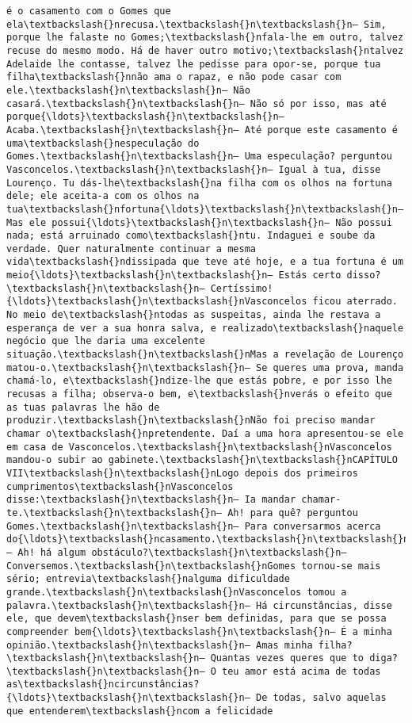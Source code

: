 \documentclass[11pt]{article}
\begin{document}
\begin{Verbatim}[commandchars=\\\{\}]
é o casamento com o Gomes que ela\textbackslash{}nrecusa.\textbackslash{}n\textbackslash{}n— Sim, porque lhe falaste no Gomes;\textbackslash{}nfala-lhe em outro, talvez recuse do mesmo modo. Há de haver outro motivo;\textbackslash{}ntalvez Adelaide lhe contasse, talvez lhe pedisse para opor-se, porque tua filha\textbackslash{}nnão ama o rapaz, e não pode casar com ele.\textbackslash{}n\textbackslash{}n— Não casará.\textbackslash{}n\textbackslash{}n— Não só por isso, mas até porque{\ldots}\textbackslash{}n\textbackslash{}n— Acaba.\textbackslash{}n\textbackslash{}n— Até porque este casamento é uma\textbackslash{}nespeculação do Gomes.\textbackslash{}n\textbackslash{}n— Uma especulação? perguntou Vasconcelos.\textbackslash{}n\textbackslash{}n— Igual à tua, disse Lourenço. Tu dás-lhe\textbackslash{}na filha com os olhos na fortuna dele; ele aceita-a com os olhos na tua\textbackslash{}nfortuna{\ldots}\textbackslash{}n\textbackslash{}n— Mas ele possui{\ldots}\textbackslash{}n\textbackslash{}n— Não possui nada; está arruinado como\textbackslash{}ntu. Indaguei e soube da verdade. Quer naturalmente continuar a mesma vida\textbackslash{}ndissipada que teve até hoje, e a tua fortuna é um meio{\ldots}\textbackslash{}n\textbackslash{}n— Estás certo disso?\textbackslash{}n\textbackslash{}n— Certíssimo!{\ldots}\textbackslash{}n\textbackslash{}nVasconcelos ficou aterrado. No meio de\textbackslash{}ntodas as suspeitas, ainda lhe restava a esperança de ver a sua honra salva, e realizado\textbackslash{}naquele negócio que lhe daria uma excelente situação.\textbackslash{}n\textbackslash{}nMas a revelação de Lourenço matou-o.\textbackslash{}n\textbackslash{}n— Se queres uma prova, manda chamá-lo, e\textbackslash{}ndize-lhe que estás pobre, e por isso lhe recusas a filha; observa-o bem, e\textbackslash{}nverás o efeito que as tuas palavras lhe hão de produzir.\textbackslash{}n\textbackslash{}nNão foi preciso mandar chamar o\textbackslash{}npretendente. Daí a uma hora apresentou-se ele em casa de Vasconcelos.\textbackslash{}n\textbackslash{}nVasconcelos mandou-o subir ao gabinete.\textbackslash{}n\textbackslash{}nCAPÍTULO VII\textbackslash{}n\textbackslash{}nLogo depois dos primeiros cumprimentos\textbackslash{}nVasconcelos disse:\textbackslash{}n\textbackslash{}n— Ia mandar chamar-te.\textbackslash{}n\textbackslash{}n— Ah! para quê? perguntou Gomes.\textbackslash{}n\textbackslash{}n— Para conversarmos acerca do{\ldots}\textbackslash{}ncasamento.\textbackslash{}n\textbackslash{}n— Ah! há algum obstáculo?\textbackslash{}n\textbackslash{}n— Conversemos.\textbackslash{}n\textbackslash{}nGomes tornou-se mais sério; entrevia\textbackslash{}nalguma dificuldade grande.\textbackslash{}n\textbackslash{}nVasconcelos tomou a palavra.\textbackslash{}n\textbackslash{}n— Há circunstâncias, disse ele, que devem\textbackslash{}nser bem definidas, para que se possa compreender bem{\ldots}\textbackslash{}n\textbackslash{}n— É a minha opinião.\textbackslash{}n\textbackslash{}n— Amas minha filha?\textbackslash{}n\textbackslash{}n— Quantas vezes queres que to diga?\textbackslash{}n\textbackslash{}n— O teu amor está acima de todas as\textbackslash{}ncircunstâncias?{\ldots}\textbackslash{}n\textbackslash{}n— De todas, salvo aquelas que entenderem\textbackslash{}ncom a felicidade 
\end{Verbatim}
\end{document}
